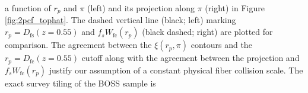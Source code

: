                                                                                                                                                                                                                                                                           a function of $r_p$ and $\pi$ (left) and its projection 
                                                                                                                                                                                                                                                                          along $\pi$ (right) in Figure \ref{fig:2pcf_tophat}. The dashed vertical 
                                                                                                                                                                                                                                                                          line (black; left) marking $r_p = D_\mathrm{fs}(z=0.55)$ and $f_s W_\mathrm{fc}(r_p)$ 
                                                                                                                                                                                                                                                                          (black dashed; right) are plotted for comparison. The agreement 
                                                                                                                                                                                                                                                                          between the $\xi(r_p, \pi)$ contours and the $r_p = D_\mathrm{fc}(z=0.55)$ 
                                                                                                                                                                                                                                                                          cutoff along with the agreement between the projection and 
                                                                                                                                                                                                                                                                          $f_s W_\mathrm{fc}(r_p)$ justify our assumption of a constant physical 
                                                                                                                                                                                                                                                                          fiber collision scale. The exact survey tiling of the BOSS sample is 
